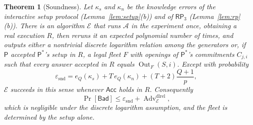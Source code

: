 \documentclass[11pt]{article}
\newtheorem{theorem}[lemma]{Theorem}
\theoremstyle{definition}
\theoremstyle{remark}
\newcommand{\Adv}{\operatorname{Adv}}
\newcommand{\Out}{\operatorname{Out}}
\newcommand{\RP}{\mathsf{RP}}
\begin{document}
\begin{theorem}[Soundness]\label{thm:soundness}
Let $\kappa_s$ and $\kappa_n$ be the knowledge errors of the interactive setup protocol (Lemma~\ref{lem:setup}(b)) and of $\RP_3$ (Lemma~\ref{lem:rp}(b)). There is an algorithm $\mathcal E$ that runs $\mathcal A$ in the experiment once, obtaining a real execution $R$, then reruns it an expected polynomial number of times, and outputs either a nontrivial discrete logarithm relation among the generators or, if $\mathsf P$ accepted $\mathsf P^\ast$'s setup in $R$, a legal fleet $F$ with openings of $\mathsf P^\ast$'s commitments $C_{j,i}$ such that every answer accepted in $R$ equals $\Out_F(S,i)$. Except with probability
\[
  \varepsilon_{\mathrm{snd}}=e_Q(\kappa_s)+T\,e_Q(\kappa_n)+(T+2)\frac{Q+1}{p},
\]
$\mathcal E$ succeeds in this sense whenever $\mathsf{Acc}$ holds in $R$. Consequently
\[
  \Pr[\mathsf{Bad}]\le\varepsilon_{\mathrm{snd}}+\Adv^{\mathrm{dlrel}}_{\mathcal E},
\]
which is negligible under the discrete logarithm assumption, and the fleet is determined by the setup alone.
\end{theorem}
\end{document}
